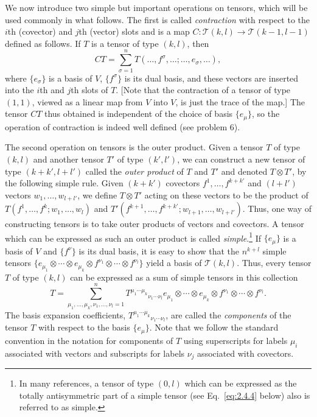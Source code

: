 We now introduce two simple but important operations on tensors, which will be
used commonly in what follows.  The first is called \emph{contraction} with
respect to the \(i\)th (covector) and \(j\)th (vector) slots and is a map
\(C:\mathcal T(k,l)\to\mathcal T(k-1,l-1)\) defined as follows.  If \(T\) is a
tensor of type \((k,l)\), then
\begin{equation}
  CT=\sum_{\sigma=1}^n
  T(\ldots,f^{\sigma},\ldots;\ldots,e_\sigma,\ldots) ,
  \tag{2.3.2}\label{eq:2.3.2}
\end{equation}
where \(\{e_\sigma\}\) is a basis of \(V\), \(\{f^{\sigma}\}\) is its dual basis,
and these vectors are inserted into the \(i\)th and \(j\)th slots of \(T\).  [Note
that the contraction of a tensor of type \((1,1)\), viewed as a linear map from
\(V\) into \(V\), is just the trace of the map.]  The tensor \(CT\) thus obtained
is independent of the choice of basis \(\{e_\mu\}\), so the operation of
contraction is indeed well defined (see problem 6).

The second operation on tensors is the outer product.  Given a tensor \(T\) of type
\((k,l)\) and another tensor \(T'\) of type \((k',l')\), we can construct a new
tensor of type \((k+k',l+l')\) called the \emph{outer product} of \(T\) and \(T'\)
and denoted \(T\otimes T'\), by the following simple rule.  Given \((k+k')\)
covectors \(f^{1},\ldots,f^{k+k'}\) and \((l+l')\) vectors
\(w_1,\ldots,w_{l+l'}\), we define \(T\otimes T'\) acting on these vectors to be
the product of \(T(f^{1},\ldots,f^{k};w_1,\ldots,w_l)\) and
\(T'(f^{k+1},\ldots,f^{k+k'};w_{l+1},\ldots,w_{l+l'})\).  Thus, one way of
constructing tensors is to take outer products of vectors and covectors.  A tensor
which can be expressed as such an outer product is called \emph{simple}.\footnote{In
many references, a tensor of type \((0,l)\) which can be expressed as the totally
antisymmetric part of a simple tensor (see Eq.~\eqref{eq:2.4.4} below) also is
referred to as simple.} If \(\{e_\mu\}\) is a basis of \(V\) and
\(\{f^{\nu}\}\) is its dual basis, it is easy to show that the \(n^{k+l}\) simple
tensors
\(\{e_{\mu_1}\otimes\cdots\otimes e_{\mu_k}\otimes f^{\nu_1}\otimes\cdots\otimes
f^{\nu_l}\}\) yield a basis of \(\mathcal T(k,l)\).  Thus, every tensor \(T\) of
type \((k,l)\) can be expressed as a sum of simple tensors in this collection
\begin{equation}
  T=\sum_{\mu_1,\ldots,\mu_k,\nu_1,\ldots,\nu_l=1}^n
  T^{\mu_1\cdots\mu_k}{}_{\nu_1\cdots\nu_l}
  e_{\mu_1}\otimes\cdots\otimes e_{\mu_k}\otimes
  f^{\nu_1}\otimes\cdots\otimes f^{\nu_l} .
  \tag{2.3.3}\label{eq:2.3.3}
\end{equation}
The basis expansion coefficients, \(T^{\mu_1\cdots\mu_k}{}_{\nu_1\cdots\nu_l}\),
are called the \emph{components} of the tensor \(T\) with respect to the basis
\(\{e_\mu\}\).  Note that we follow the standard convention in the notation for
components of \(T\) using superscripts for labels \(\mu_i\) associated with vectors
and subscripts for labels \(\nu_j\) associated with covectors.


